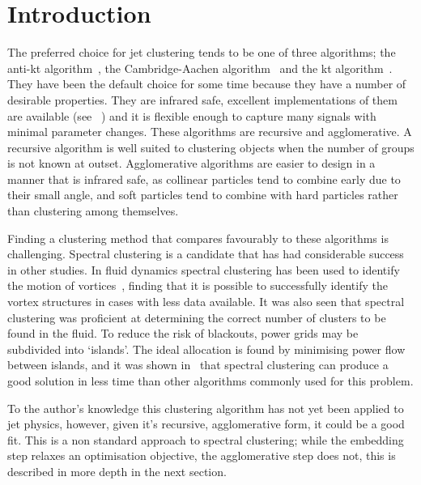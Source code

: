 \section{Introduction}\label{sec:JetClustering}

The preferred choice for jet clustering tends to be one of three algorithms;
the anti-kt algorithm~\cite{Cacciari2008akt}, the Cambridge-Aachen algorithm~\cite{Wobisch1998caJet} and the kt algorithm~\cite{Ellis1993ktJet}.
They have been the default choice for some time because they have a number of desirable properties.
They are infrared safe, excellent implementations of them are available (see \fastjet{}~\cite{Cacciari2011FastJet})
and it is flexible enough to capture many signals with minimal parameter changes.
These algorithms are recursive and agglomerative.
A recursive algorithm is well suited to clustering objects when the number of groups is not known at outset.
Agglomerative algorithms are easier to design in a manner that is infrared safe,
as collinear particles tend to combine early due to their small angle,
and soft particles tend to combine with hard particles rather than clustering among themselves.

Finding a clustering method that compares favourably to these algorithms is challenging.
Spectral clustering is a candidate that has had considerable success in other studies.
In fluid dynamics spectral clustering has been used to identify the motion
of vortices~\cite{hadjighasem2016votex}, finding that it is possible
to successfully identify the vortex structures in cases with less data available.
It was also seen that spectral clustering was proficient at determining the correct number
of clusters to be found in the fluid.
To reduce the risk of blackouts, power grids may be subdivided into `islands'.
The ideal allocation is found by minimising power flow between islands,
and it was shown in~\cite{fennelly2014power} that spectral clustering
can produce a good solution in less time than other algorithms commonly used for this problem.


To the author's knowledge this clustering algorithm has not yet been applied to jet physics, %
however, given it's recursive, agglomerative form, it could be a good fit.
This is a non standard approach to spectral clustering; while the embedding step relaxes an optimisation objective,
the agglomerative step does not, this is described in more depth in the next section.
